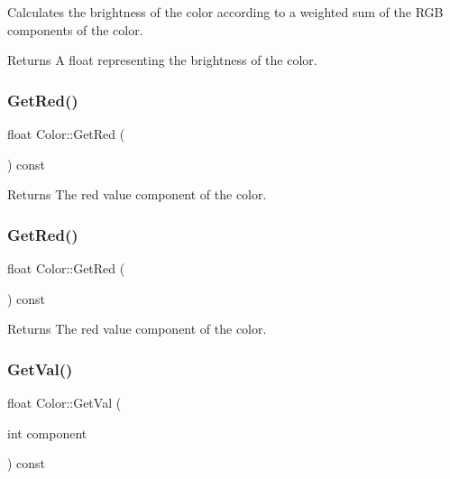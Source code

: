 Calculates the brightness of the color according to a weighted sum of the R\+GB components of the color. 

\begin{DoxyReturn}{Returns}
A float representing the brightness of the color. 
\end{DoxyReturn}
\mbox{\label{classColor_aaf750ff9360c9eb6abf1de07ec710c1e}} 
\subsubsection{\texorpdfstring{Get\+Red()}{GetRed()}\hspace{0.1cm}{\footnotesize\ttfamily [1/2]}}
{\footnotesize\ttfamily float Color\+::\+Get\+Red (\begin{DoxyParamCaption}{ }\end{DoxyParamCaption}) const\hspace{0.3cm}{\ttfamily [inline]}}

\begin{DoxyReturn}{Returns}
The red value component of the color. 
\end{DoxyReturn}
\mbox{\label{classColor_aaf750ff9360c9eb6abf1de07ec710c1e}} 
\subsubsection{\texorpdfstring{Get\+Red()}{GetRed()}\hspace{0.1cm}{\footnotesize\ttfamily [2/2]}}
{\footnotesize\ttfamily float Color\+::\+Get\+Red (\begin{DoxyParamCaption}{ }\end{DoxyParamCaption}) const\hspace{0.3cm}{\ttfamily [inline]}}

\begin{DoxyReturn}{Returns}
The red value component of the color. 
\end{DoxyReturn}
\mbox{\label{classColor_ae8aa52d3ec0bb13f4f9732d9487a5431}} 
\subsubsection{\texorpdfstring{Get\+Val()}{GetVal()}\hspace{0.1cm}{\footnotesize\ttfamily [1/2]}}
{\footnotesize\ttfamily float Color\+::\+Get\+Val (\begin{DoxyParamCaption}\item[{int}]{component }\end{DoxyParamCaption}) const\hspace{0.3cm}{\ttfamily [inline]}}

